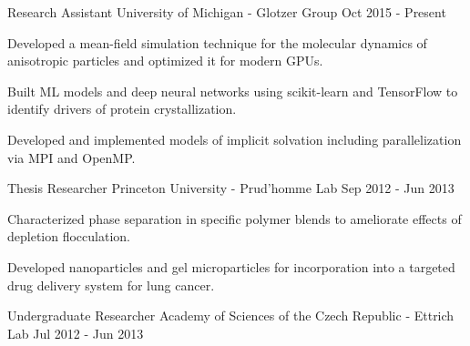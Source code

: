 \newcommand{\ecoli}{\emph{E. coli }}
\newcommand{\ejub}{\emph{E. jubatus }}
\newcommand{\gal}{\emph{G. g. domesticus}}
\vspace{-1em}
\begin{cventries}
  \cventry
    {Research Assistant} %
    {University of Michigan - Glotzer Group} %
    {} %
    {Oct 2015 - Present} %
    {
      \begin{cvitems} %
        \item Developed a mean-field simulation technique for the molecular dynamics of anisotropic particles and optimized it for modern GPUs.
        \item Built ML models and deep neural networks using scikit-learn and TensorFlow to identify drivers of protein crystallization.
        \item Developed and implemented models of implicit solvation including parallelization via MPI and OpenMP.
      \end{cvitems}
    }
  \cventry
    {Thesis Researcher} %
    {Princeton University - Prud'homme Lab} %
    {} %
    {Sep 2012 - Jun 2013} %
    {
      \begin{cvitems} %
        \item Characterized phase separation in specific polymer blends to ameliorate effects of depletion flocculation.
	    \item Developed nanoparticles and gel microparticles for incorporation into a targeted drug delivery system for lung cancer.
      \end{cvitems}
    }
  \cventry
    {Undergraduate Researcher} %
    {Academy of Sciences of the Czech Republic - Ettrich Lab} %
    {} %
    {Jul 2012 - Jun 2013} %
    {
      \begin{cvitems} %

\end{cvitems}}
\end{cventries}
